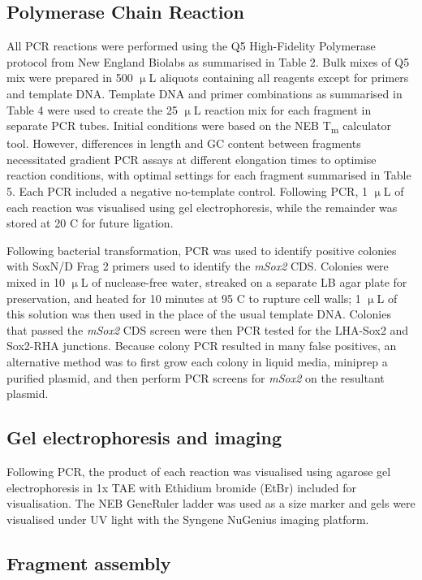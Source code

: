 \documentclass[withindex,glossary]{cam-thesis}
\begin{document}
\subsection{Polymerase Chain Reaction}

All \gls{PCR} reactions were performed using the Q5 High-Fidelity Polymerase
protocol from New England Biolabs as summarised in Table 2. Bulk mixes
of Q5 mix were prepared in 500 $\upmu{}$L aliquots containing all reagents
except for primers and template DNA. Template DNA and primer
combinations as summarised in Table 4 were used to create the 25 $\upmu{}$L
reaction mix for each fragment in separate PCR tubes. Initial conditions
were based on the NEB T\textsubscript{m} calculator tool. However,
differences in length and GC content between fragments necessitated
gradient PCR assays at different elongation times to optimise reaction
conditions, with optimal settings for each fragment summarised in Table
5. Each PCR included a negative no-template control. Following PCR, 1 $\upmu{}$L
of each reaction was visualised using gel electrophoresis, while the
remainder was stored at \textminus{}20 \textdegree{}C for future ligation.

Following bacterial transformation, PCR was used to identify positive
colonies with SoxN/D Frag 2 primers used to identify the \emph{mSox2}
CDS. Colonies were mixed in 10 $\upmu{}$L of nuclease-free water, streaked on a
separate LB agar plate for preservation, and heated for 10 minutes at 95
\textdegree{}C to rupture cell walls; 1 $\upmu{}$L of this solution was then used in the
place of the usual template DNA. Colonies that passed the \emph{mSox2}
CDS screen were then PCR tested for the LHA-Sox2 and Sox2-RHA junctions.
Because colony PCR resulted in many false positives, an alternative
method was to first grow each colony in liquid media, miniprep a
purified plasmid, and then perform PCR screens for \emph{mSox2} on the
resultant plasmid.

\subsection{Gel electrophoresis and imaging}

Following PCR, the product of each reaction was visualised using agarose
gel electrophoresis in 1x TAE with Ethidium bromide (\gls{EtBr}) included for
visualisation. The NEB GeneRuler ladder was used as a size marker and
gels were visualised under UV light with the Syngene NuGenius imaging
platform.

\subsection{Fragment assembly}
\end{document}
